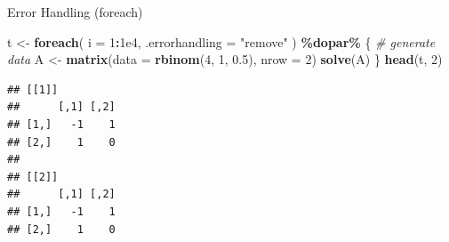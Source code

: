 \documentclass[
  ignorenonframetext,
]{beamer}
\newenvironment{Shaded}{\begin{snugshade}}{\end{snugshade}}
\newcommand{\AttributeTok}[1]{\textcolor[rgb]{0.13,0.29,0.53}{#1}}
\newcommand{\CommentTok}[1]{\textcolor[rgb]{0.56,0.35,0.01}{\textit{#1}}}
\newcommand{\DecValTok}[1]{\textcolor[rgb]{0.00,0.00,0.81}{#1}}
\newcommand{\FloatTok}[1]{\textcolor[rgb]{0.00,0.00,0.81}{#1}}
\newcommand{\FunctionTok}[1]{\textcolor[rgb]{0.13,0.29,0.53}{\textbf{#1}}}
\newcommand{\NormalTok}[1]{#1}
\newcommand{\OtherTok}[1]{\textcolor[rgb]{0.56,0.35,0.01}{#1}}
\newcommand{\SpecialCharTok}[1]{\textcolor[rgb]{0.81,0.36,0.00}{\textbf{#1}}}
\newcommand{\StringTok}[1]{\textcolor[rgb]{0.31,0.60,0.02}{#1}}
\begin{document}
\begin{frame}[fragile]{Error Handling (foreach)}
\protect{}\label{error-handling-foreach-2}
\small

\begin{Shaded}
\begin{Highlighting}[]
\NormalTok{t }\OtherTok{\textless{}{-}} \FunctionTok{foreach}\NormalTok{(}
  \AttributeTok{i =} \DecValTok{1}\SpecialCharTok{:}\FloatTok{1e4}\NormalTok{,}
  \AttributeTok{.errorhandling =} \StringTok{"remove"}
\NormalTok{) }\SpecialCharTok{\%dopar\%}\NormalTok{ \{}
  \CommentTok{\# generate data}
\NormalTok{  A }\OtherTok{\textless{}{-}} \FunctionTok{matrix}\NormalTok{(}\AttributeTok{data =} \FunctionTok{rbinom}\NormalTok{(}\DecValTok{4}\NormalTok{, }\DecValTok{1}\NormalTok{, }\FloatTok{0.5}\NormalTok{), }\AttributeTok{nrow =} \DecValTok{2}\NormalTok{)}
  \FunctionTok{solve}\NormalTok{(A)}
\NormalTok{\}}
\FunctionTok{head}\NormalTok{(t, }\DecValTok{2}\NormalTok{)}
\end{Highlighting}
\end{Shaded}

\begin{verbatim}
## [[1]]
##      [,1] [,2]
## [1,]   -1    1
## [2,]    1    0
## 
## [[2]]
##      [,1] [,2]
## [1,]   -1    1
## [2,]    1    0
\end{verbatim}
\end{frame}
\end{document}
